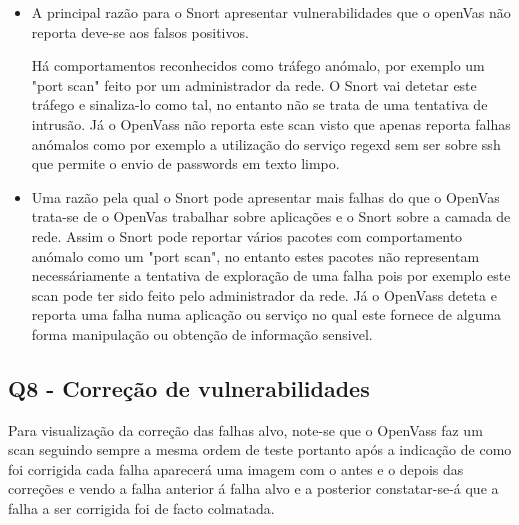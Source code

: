 \begin{itemize}
\item A principal razão para o Snort apresentar vulnerabilidades que o openVas não reporta deve-se aos falsos positivos.
\par Há comportamentos reconhecidos como tráfego anómalo, por exemplo um "port scan" feito por um administrador da rede. O Snort vai detetar este tráfego e sinaliza-lo como tal, no entanto não se trata de uma tentativa de intrusão. Já o OpenVass não reporta este scan visto que apenas reporta falhas anómalos como por exemplo a utilização do serviço regexd sem ser sobre ssh que permite o envio de passwords em texto limpo.   

\item Uma razão pela qual o Snort pode apresentar mais falhas do que o OpenVas trata-se de o OpenVas trabalhar sobre aplicações e o Snort sobre a camada de rede. Assim o Snort pode reportar vários pacotes com comportamento anómalo como um "port scan", no entanto estes pacotes não representam necessáriamente a tentativa de exploração de uma falha pois por exemplo este scan pode ter sido feito pelo administrador da rede. Já o OpenVass deteta e reporta uma falha numa aplicação ou serviço no qual este fornece de alguma forma manipulação ou obtenção de informação sensivel.

\end{itemize}
\subsection{Q8 - Correção de vulnerabilidades}

\par Para visualização da correção das falhas alvo, note-se que o OpenVass faz um scan seguindo sempre a mesma ordem de teste portanto após a indicação de como foi corrigida cada falha aparecerá uma imagem com o antes e o depois das correções e vendo a falha anterior á falha alvo e a posterior constatar-se-á que a falha a ser corrigida foi de facto colmatada.

